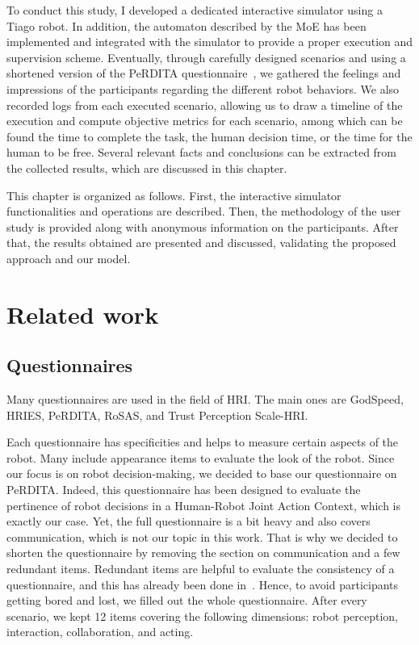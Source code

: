 To conduct this study, I developed a dedicated interactive simulator using a Tiago robot. In addition, the automaton described by the MoE has been implemented and integrated with the simulator to provide a proper execution and supervision scheme. Eventually, through carefully designed scenarios and using a shortened version of the PeRDITA questionnaire~\cite{devin_evaluating_2018}, we gathered the feelings and impressions of the participants regarding the different robot behaviors. We also recorded logs from each executed scenario, allowing us to draw a timeline of the execution and compute objective metrics for each scenario, among which can be found the time to complete the task, the human decision time, or the time for the human to be free. Several relevant facts and conclusions can be extracted from the collected results, which are discussed in this chapter.

This chapter is organized as follows. First, the interactive simulator functionalities and operations are described. Then, the methodology of the user study is provided along with anonymous information on the participants. After that, the results obtained are presented and discussed, validating the proposed approach and our model.

\section{Related work}

\subsection{Questionnaires}
Many questionnaires are used in the field of HRI. The main ones are GodSpeed, HRIES, PeRDITA, RoSAS, and Trust Perception Scale-HRI. 

Each questionnaire has specificities and helps to measure certain aspects of the robot. Many include appearance items to evaluate the look of the robot. Since our focus is on robot decision-making, we decided to base our questionnaire on PeRDITA. Indeed, this questionnaire has been designed to evaluate the pertinence of robot decisions in a Human-Robot Joint Action Context, which is exactly our case. Yet, the full questionnaire is a bit heavy and also covers communication, which is not our topic in this work. 
That is why we decided to shorten the questionnaire by removing the section on communication and a few redundant items. Redundant items are helpful to evaluate the consistency of a questionnaire, and this has already been done in~\cite{devin_evaluating_2018}. Hence, to avoid participants getting bored and lost, we filled out the whole questionnaire. After every scenario, we kept 12 items covering the following dimensions: robot perception, interaction, collaboration, and acting.



